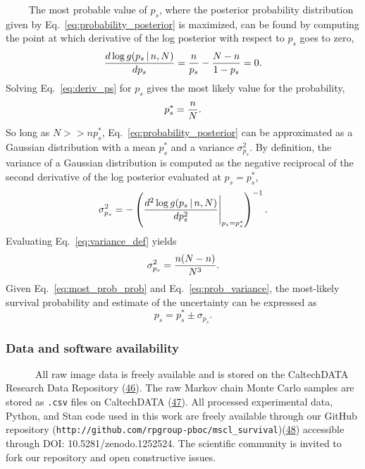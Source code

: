 ~~~~
The
most
probable
value
of
\(p_s\),
where
the
posterior
probability
distribution
given
by
Eq.~\ref{eq:probability_posterior}
is
maximized,
can be
found
by
computing
the
point
at
which
derivative
of the
log
posterior
with
respect
to
\(p_s\)
goes
to
zero,
\begin{equation}
{d\log g(p_s\,\vert\,n, N) \over d p_s} = {n \over p_s} - {N - n  \over 1 - p_s} = 0.
\label{eq:deriv_ps}\end{equation}
Solving
Eq.~\ref{eq:deriv_ps}
for
\(p_s\)
gives
the
most
likely
value
for
the
probability,
\begin{equation}
p_s^* = {n \over N}.
\label{eq:most_prob_prob}\end{equation}
So
long
as
\(N >> np_s^*\),
Eq.~\ref{eq:probability_posterior}
can be
approximated
as a
Gaussian
distribution
with a
mean
\(p_s^*\)
and a
variance
\(\sigma_{p_s}^2\).
By
definition,
the
variance
of a
Gaussian
distribution
is
computed
as the
negative
reciprocal
of the
second
derivative
of the
log
posterior
evaluated
at
\(p_s = p_s^*\),
\begin{equation}
\sigma_{p_s}^2 = - \left({d^2 \log g(p_s\,\vert\, n, N) \over dp_s^2}\Bigg\vert_{p_s=p_s^*}\right)^{-1}.
\label{eq:variance_def}\end{equation}
Evaluating
Eq.~\ref{eq:variance_def}
yields
\begin{equation}
\sigma_{p_s}^2 = {n(N-n)\over N^3}.
\label{eq:prob_variance}\end{equation}
Given
Eq.~\ref{eq:most_prob_prob}
and
Eq.~\ref{eq:prob_variance},
the
most-likely
survival
probability
and
estimate
of the
uncertainty
can be
expressed
as
\begin{equation}
p_s = p_s^* \pm \sigma_{p_s}.
\end{equation}

\subsubsection{Data
and
software
availability}\label{data-and-software-availability}

~ ~ ~
~All
raw
image
data
is
freely
available
and is
stored
on the
CaltechDATA
Research
Data
Repository
(\protect\hyperlink{ref-chure2018a}{46}).
The
raw
Markov
chain
Monte
Carlo
samples
are
stored
as
\texttt{.csv}
files
on
CaltechDATA
(\protect\hyperlink{ref-chure2018}{47}).
All
processed
experimental
data,
Python,
and
Stan
code
used
in
this
work
are
freely
available
through
our
GitHub
repository
(\texttt{http://github.com/rpgroup-pboc/mscl\_survival})(\protect\hyperlink{ref-chure2018b}{48})
accessible
through
DOI:
10.5281/zenodo.1252524.
The
scientific
community
is
invited
to
fork
our
repository
and
open
constructive
issues.

